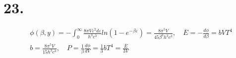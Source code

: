\documentclass[UTF8]{ctexart}
\begin{document}
\section*{23.}
\begin{equation*}
  \begin{aligned}
     & \phi(\beta,y)=-\int_0^\infty \frac{8\pi V\varepsilon^2d\varepsilon}{h^3c^3}ln(1-e^
    {-\beta\varepsilon})=\frac{8\pi^5V}{45\beta^3h^3c^3},\quad\overline{E}=-\frac{d\phi}
    {d\beta}=bVT^4                                                                        \\
     & b=\frac{8\pi^5V}{15h^3c^3},\quad P=\frac{1}{\beta}\frac{d\phi}{dV}=\frac{1}{3}bT
    ^4=\frac{\overline{E}}{3V}                                                            \\
  \end{aligned}
\end{equation*}
\end{document}
